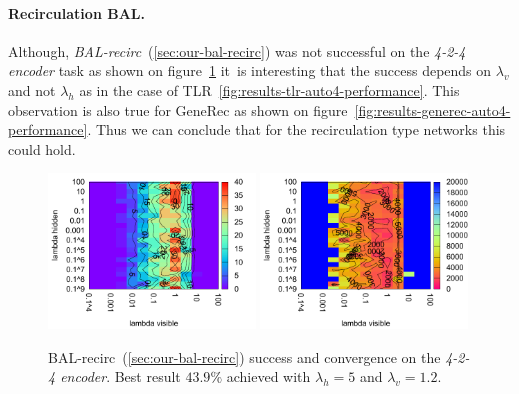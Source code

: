 \paragraph{Recirculation BAL.} 

Although, \emph{BAL-recirc}~(\ref{sec:our-bal-recirc}) was not successful on the \emph{4-2-4 encoder} task as shown on figure~\ref{fig:results-bal-recirc-auto4-performance} it~is interesting that the success depends on $\lambda_v$ and not $\lambda_h$ as in the case of TLR~\ref{fig:results-tlr-auto4-performance}. This observation is also true for GeneRec as shown on figure~\ref{fig:results-generec-auto4-performance}. Thus we can conclude that for the recirculation type networks this could hold. 
\begin{figure}[H]
  \centering
  \includegraphics[width=0.49\textwidth]{img/bal-recirc-auto4-success.pdf}   
  \includegraphics[width=0.49\textwidth]{img/bal-recirc-auto4-epoch.pdf}     
  \caption{BAL-recirc~(\ref{sec:our-bal-recirc}) success and convergence on the \emph{4-2-4 encoder}. Best result $43.9\%$ achieved with $\lambda_h=5$ and $\lambda_v=1.2$.}
  \label{fig:results-bal-recirc-auto4-performance}
\end{figure}

